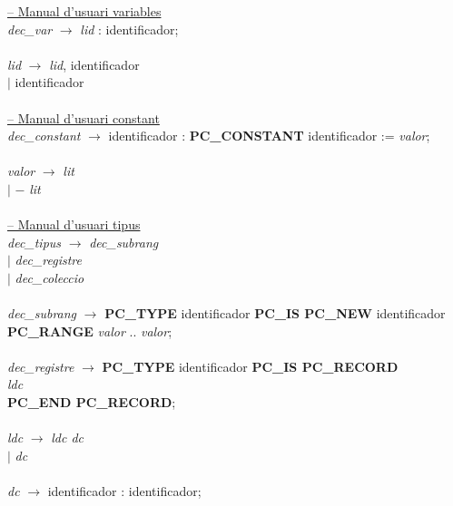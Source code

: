 \begin{tabbing}
        \underline{-- Manual d'usuari variables} \\
        \textit{dec\_var} \> $\rightarrow$ \> \textit{lid} : identificador; \\
        \\
        \textit{lid} \> $\rightarrow$ \> \textit{lid}, identificador \\
        \> $\mid$ \> identificador \\
        \\
        
        \underline{-- Manual d'usuari constant} \\
        \textit{dec\_constant} \> $\rightarrow$ \> identificador : \textbf{PC\_CONSTANT} identificador := \textit{valor};  \\
        \\
        \textit{valor} \> $\rightarrow$ \> \textit{lit} \\
        \> $\mid$ \> $-$ \textit{lit} \\
        \\
        
        \underline{-- Manual d'usuari tipus} \\
        \textit{dec\_tipus} \> $\rightarrow$ \> \textit{dec\_subrang}  \\
        \> $\mid$ \> \textit{dec\_registre} \\
        \> $\mid$ \> \textit{dec\_coleccio} \\
        \\
        \textit{dec\_subrang} \> $\rightarrow$ \> \textbf{PC\_TYPE} identificador \textbf{PC\_IS PC\_NEW} identificador 
			\\\> \textbf{PC\_RANGE} \textit{valor} .. \textit{valor}; \\
        \\
        \textit{dec\_registre} \> $\rightarrow$ \> \textbf{PC\_TYPE} identificador \textbf{PC\_IS PC\_RECORD} \\
        \> \> \> \textit{ldc} \\
        \> \> \textbf{PC\_END PC\_RECORD}; \\
        \\
        \textit{ldc} \> $\rightarrow$ \> \textit{ldc dc} \\
        \> $\mid$ \> \textit{dc} \\
        \\
        \textit{dc} \> $\rightarrow$ \> identificador : identificador; \\
        \\
        

\end{tabbing}
